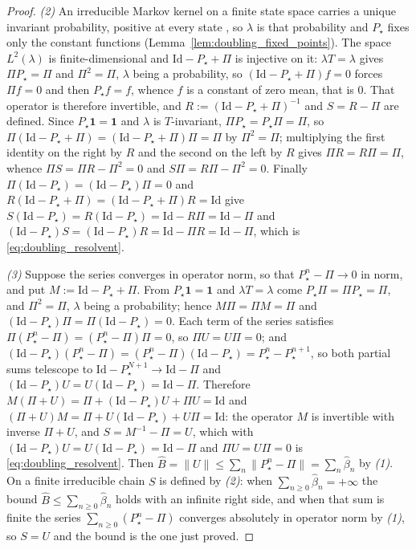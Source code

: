 \begin{proof}
\emph{(2)} An irreducible Markov kernel on a finite state space carries a unique invariant
probability, positive at every state \citep{levin2017markov}, so $\lambda$ is that probability
and $P_\star$ fixes only the constant functions
(Lemma~\ref{lem:doubling_fixed_points}). The space $L^2(\lambda)$ is finite-dimensional and
$\mathrm{Id}-P_\star+\Pi$ is injective on it: $\lambda T=\lambda$ gives $\Pi P_\star=\Pi$ and
$\Pi^2=\Pi$, $\lambda$ being a probability, so $(\mathrm{Id}-P_\star+\Pi)f=0$ forces
$\Pi f=0$ and then $P_\star f=f$, whence $f$ is a constant of zero mean, that is $0$. That
operator is therefore invertible, and $R:=(\mathrm{Id}-P_\star+\Pi)^{-1}$ and $S=R-\Pi$ are
defined. Since $P_\star\mathbf 1=\mathbf 1$ and $\lambda$ is $T$-invariant,
$\Pi P_\star=P_\star\Pi=\Pi$, so $\Pi(\mathrm{Id}-P_\star+\Pi)=(\mathrm{Id}-P_\star+\Pi)\Pi=\Pi$
by $\Pi^2=\Pi$; multiplying the first identity on the right by $R$ and the second on the left by
$R$ gives $\Pi R=R\Pi=\Pi$, whence $\Pi S=\Pi R-\Pi^2=0$ and $S\Pi=R\Pi-\Pi^2=0$. Finally
$\Pi(\mathrm{Id}-P_\star)=(\mathrm{Id}-P_\star)\Pi=0$ and $R(\mathrm{Id}-P_\star+\Pi)=(\mathrm{Id}-P_\star+\Pi)R=\mathrm{Id}$
give $S(\mathrm{Id}-P_\star)=R(\mathrm{Id}-P_\star)=\mathrm{Id}-R\Pi=\mathrm{Id}-\Pi$ and
$(\mathrm{Id}-P_\star)S=(\mathrm{Id}-P_\star)R=\mathrm{Id}-\Pi R=\mathrm{Id}-\Pi$, which is
\eqref{eq:doubling_resolvent}.

\emph{(3)} Suppose the series converges in operator norm, so that
$P_\star^n-\Pi\rightarrow0$ in norm, and put $M:=\mathrm{Id}-P_\star+\Pi$. From
$P_\star\mathbf 1=\mathbf 1$ and $\lambda T=\lambda$ come $P_\star\Pi=\Pi P_\star=\Pi$, and
$\Pi^2=\Pi$, $\lambda$ being a probability; hence $M\Pi=\Pi M=\Pi$ and
$(\mathrm{Id}-P_\star)\Pi=\Pi(\mathrm{Id}-P_\star)=0$. Each term of the series satisfies
$\Pi(P_\star^n-\Pi)=(P_\star^n-\Pi)\Pi=0$, so $\Pi U=U\Pi=0$; and
$(\mathrm{Id}-P_\star)(P_\star^n-\Pi)=(P_\star^n-\Pi)(\mathrm{Id}-P_\star)=P_\star^n-P_\star^{n+1}$,
so both partial sums telescope to $\mathrm{Id}-P_\star^{N+1}\rightarrow\mathrm{Id}-\Pi$ and
$(\mathrm{Id}-P_\star)U=U(\mathrm{Id}-P_\star)=\mathrm{Id}-\Pi$. Therefore
$M(\Pi+U)=\Pi+(\mathrm{Id}-P_\star)U+\Pi U=\mathrm{Id}$ and
$(\Pi+U)M=\Pi+U(\mathrm{Id}-P_\star)+U\Pi=\mathrm{Id}$: the operator $M$ is invertible with
inverse $\Pi+U$, and $S=M^{-1}-\Pi=U$, which with
$(\mathrm{Id}-P_\star)U=U(\mathrm{Id}-P_\star)=\mathrm{Id}-\Pi$ and $\Pi U=U\Pi=0$ is
\eqref{eq:doubling_resolvent}. Then
$\widehat B=\|U\|\leq\sum_n\|P_\star^n-\Pi\|=\sum_n\widehat\beta_n$ by \emph{(1)}. On a finite
irreducible chain $S$ is defined by \emph{(2)}: when $\sum_{n\geq0}\widehat\beta_n=+\infty$ the
bound $\widehat B\leq\sum_{n\geq0}\widehat\beta_n$ holds with an infinite right side, and when
that sum is finite the series $\sum_{n\geq0}(P_\star^n-\Pi)$ converges absolutely in operator
norm by \emph{(1)}, so $S=U$ and the bound is the one just proved.
\end{proof}

